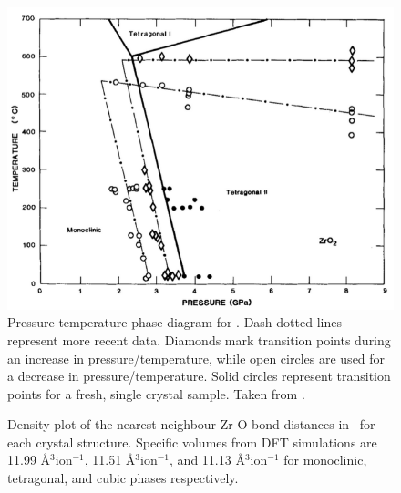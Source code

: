 \begin{figure}[htp]
  \centering
      \includegraphics[width=13cm]{images/zirconiaphasediagram.png}
  \caption[Pressure-temperature phase diagram for \zirconia . Dash-dotted lines represent more recent data. Diamonds mark transition points during an increase in pressure/temperature, while open circles are used for a decrease in pressure/temperature. Solid circles represent transition points for a fresh, single crystal sample.]{Pressure-temperature phase diagram for \zirconia . Dash-dotted lines represent more recent data. Diamonds mark transition points during an increase in pressure/temperature, while open circles are used for a decrease in pressure/temperature. Solid circles represent transition points for a fresh, single crystal sample. Taken from \cite{gando2011partial}. \label{fig:phasediagram}}
\end{figure}

\begin{figure}
\begin{center}
		\caption{Density plot of the nearest neighbour Zr-O bond distances in \zirconia\ for each crystal structure. Specific volumes from DFT simulations are 11.99 \r{A}$^{3}$ion$^{-1}$, 11.51 \r{A}$^{3}$ion$^{-1}$, and 11.13 \r{A}$^{3}$ion$^{-1}$ for monoclinic, tetragonal, and cubic phases respectively.}
		\label{figure:zrobonddistance}
	\end{center}
\end{figure}


